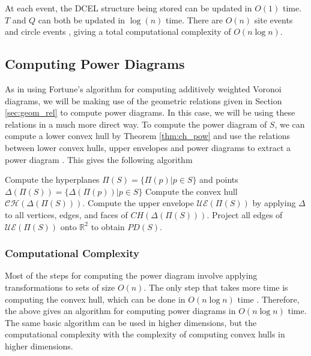 \documentclass[a4paper, 11pt]{article}
\newcommand{\R}{\mathbb{R}}
\begin{document}
At each event, the DCEL structure being stored can be updated in $O(1)$ time. $T$ and $Q$ can both be updated in $\log(n)$ time. There are $O(n)$ site
events and circle events \cite{comp_geom}, giving a total
computational complexity of $O(n \log n)$.

\subsection{Computing Power Diagrams}

As in using Fortune's algorithm for computing additively weighted Voronoi diagrams, we will be making use of the geometric relations given in
Section \ref{sec:geom_rel} to compute power diagrams. In this case, we will be using these relations in a much more direct way. To compute the power
diagram of $S$, we can compute a lower convex hull by Theorem \ref{thm:ch_pow} and use the relations between lower convex hulls, upper envelopes and
power diagrams to extract a power diagram \cite{aurenhammer_power} . This gives the following algorithm

\begin{algorithm}
  \begin{algorithmic}[1]
    \State Compute the hyperplanes $\Pi(S) = \{ \Pi(p) | p \in S \}$ and points $\Delta( \Pi(S) ) = \{ \Delta( \Pi(p) ) | p \in S \}$
    \State Compute the convex hull $\mathcal{CH} ( \Delta( \Pi(S) ) )$.
    \State Compute the upper envelope $\mathcal{UE} ( \Pi(S) )$ by applying $\Delta$ to all vertices, edges, and faces of $CH( \Delta( \Pi(S) ) )$.
    \State Project all edges of $\mathcal{UE} ( \Pi(S) )$ onto $\R^2$ to obtain $PD(S)$.
    \EndFunction
  \end{algorithmic}
\end{algorithm}

\subsubsection{Computational Complexity}

Most of the steps for computing the power diagram involve applying transformations to sets of size $O(n)$. The only step that takes more time is
computing the convex hull, which can be done in $O(n \log n)$ time \cite{comp_geom}. Therefore, the above gives an algorithm for computing power
diagrams in $O(n \log n)$ time. The same basic algorithm can be used in higher dimensions, but the computational complexity with the complexity of
computing convex hulls in higher dimensions.
\end{document}
